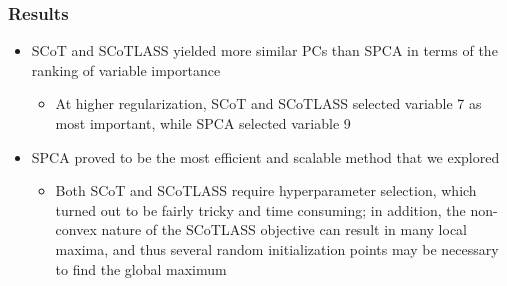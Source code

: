 \documentclass[11pt]{beamer}
\begin{document}
\begin{frame}\frametitle{Results}
\begin{itemize}
\item SCoT and SCoTLASS yielded more similar PCs than SPCA in terms of the ranking of variable importance
\begin{itemize}
    \item At higher regularization, SCoT and SCoTLASS selected variable 7 as most important, while SPCA selected variable 9
\end{itemize}
\item SPCA proved to be the most efficient and scalable method that we explored
\begin{itemize}
    \item Both SCoT and SCoTLASS require hyperparameter selection, which turned out to be fairly tricky and time consuming; in addition, the non-convex nature of the SCoTLASS objective can result in many local maxima, and thus several random initialization points may be necessary to find the global maximum
\end{itemize}
\end{itemize}
\end{frame}
\end{document}
